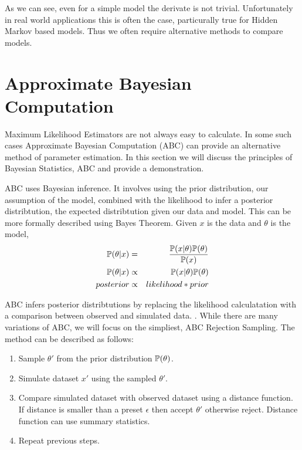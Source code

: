     As we can see, even for a simple model the derivate is not trivial. Unfortunately in real world applications this is often the case, particurally true for Hidden Markov based models. Thus we often require alternative methods to compare models.


\section{Approximate Bayesian Computation}
\label{Model_Selection:Approximate_Bayesian_Computation}

Maximum Likelihood Estimators are not always easy to calculate. In some such cases Approximate Bayesian Computation (ABC) can provide an alternative method of parameter estimation. In this section we will discuss the principles of Bayesian Statistics, ABC and provide a demonstration.

ABC uses Bayesian inference. It involves using the prior distribution, our assumption of the model, combined with the likelihood to infer a posterior distribtution, the expected distribtution given our data and model. This can be more formally described using Bayes Theorem. Given $x$ is the data and $\theta$ is the model, 
\begin{eqnarray}
    \mathbb{P}(\theta|x) & = & \dfrac{\mathbb{P}(x|\theta)\mathbb{P}(\theta)}{\mathbb{P}(x)} \\
    \mathbb{P}(\theta|x) & \propto & \mathbb{P}(x|\theta)\mathbb{P}(\theta) \\
    posterior  & \propto & likelihood * prior
\end{eqnarray}

ABC infers posterior distribtutions by replacing the likelihood calculatation with a comparison between observed and simulated data. \cite{Toni2009}. While there are many variations of ABC, we will focus on the simpliest, ABC Rejection Sampling. The method can be described as follows:

\begin{enumerate}
    \item Sample $\theta'$ from the prior distribution $\mathbb{P}(\theta)$.
    \item Simulate dataset $x'$ using the sampled $\theta'$.
    \item Compare simulated dataset with observed dataset using a distance function. If distance is smaller than a preset $\epsilon$ then accept $\theta'$ otherwise reject. Distance  function can use summary statistics.
    \item Repeat previous steps.
\end{enumerate}


